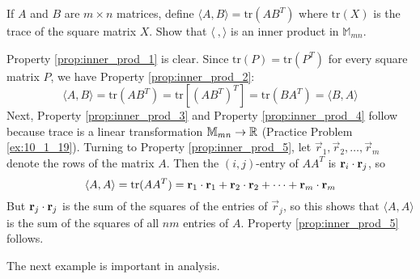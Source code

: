 \documentclass{ximera}
\begin{document}
\begin{example}\label{exa:030310}
If $A$ and $B$ are $m \times n$ matrices, define $\langle A, B\rangle = \mbox{tr}(AB^{T})$ where $\mbox{tr}(X)$ is the trace of the square matrix $X$. Show that $\langle\ , \rangle$ is an inner product in $\mathbb{M}_{mn}$.

\begin{explanation}
Property \ref{prop:inner_prod_1} is clear. Since $\mbox{tr}(P) = \mbox{tr}(P^{T})$ for every square matrix $P$, we have Property \ref{prop:inner_prod_2}:
\begin{equation*}
\langle A, B \rangle = \mbox{tr}(AB^T) = \mbox{tr}[(AB^T)^T] = \mbox{tr}(BA^T) = \langle B, A \rangle
\end{equation*}
Next, Property \ref{prop:inner_prod_3} and Property \ref{prop:inner_prod_4} follow because trace is a linear transformation $\mathbb{M}_{mn} \to \mathbb{R}$ (Practice Problem \ref{ex:10_1_19}). Turning to Property \ref{prop:inner_prod_5}, let $\vec{r}_{1}, \vec{r}_{2}, \dots, \vec{r}_{m}$ denote the rows of the matrix $A$. Then the $(i, j)$-entry of $AA^{T}$ is $\mathbf{r}_{i} \cdot \mathbf{r}_{j}$, so
\begin{equation*}
\langle A, A \rangle = \mbox{tr}(AA^T) =
\mathbf{r}_1 \cdot \mathbf{r}_1 +
\mathbf{r}_2 \cdot \mathbf{r}_2 + \dots +
\mathbf{r}_m \cdot \mathbf{r}_m
\end{equation*}
But $\mathbf{r}_{j} \cdot \mathbf{r}_{j}$ is the sum of the squares of
the entries of $\vec{r}_{j}$, so this shows that $\langle A, A\rangle$ is the sum of the squares of all $nm$ entries of $A$.  Property \ref{prop:inner_prod_5} follows.
\end{explanation}
\end{example}

The next example is important in analysis.
\end{document}
